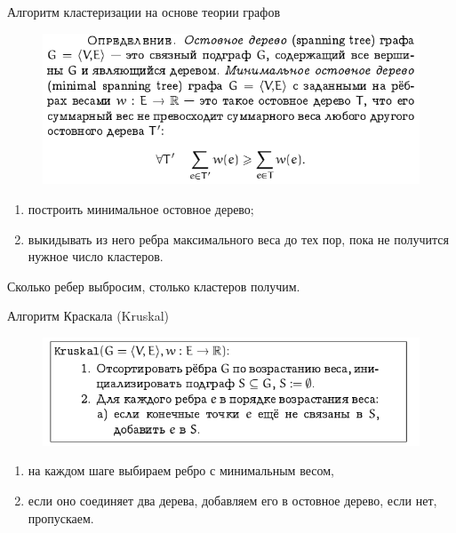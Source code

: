 \documentclass{beamer}
\begin{document}
\begin{frame}{Алгоритм кластеризации на основе теории графов}
\begin{figure}[h]
\centering
\includegraphics[scale=0.65]{images/lec07-pic19.png}
\end{figure}
\begin{enumerate}
\item построить минимальное остовное дерево;
\item выкидывать из него ребра максимального веса до тех пор, пока не получится нужное число кластеров. \end{enumerate}
Сколько ребер выбросим, столько кластеров получим.
\end{frame}

\begin{frame}{Алгоритм Краскала (Kruskal)}
\begin{figure}[h]
\centering
\includegraphics[scale=0.65]{images/lec07-pic20.png}
\end{figure}
\begin{enumerate}
\item на каждом шаге выбираем ребро с минимальным весом, 
\item если оно соединяет два дерева, добавляем его в остовное дерево, если нет, пропускаем. 
\end{enumerate}
\end{frame}
\end{document}
